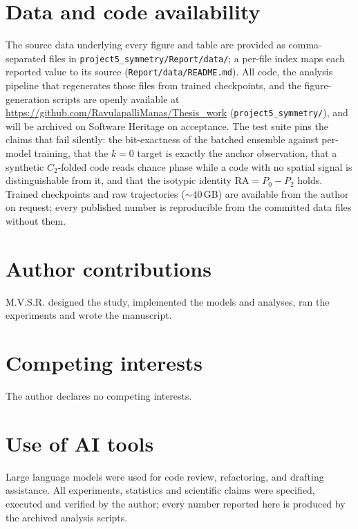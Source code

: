 \section*{Data and code availability}

The source data underlying every figure and table are provided as comma-separated files in
\texttt{project5\_symmetry/Report/data/}; a per-file index maps each reported value to its
source (\texttt{Report/data/README.md}). All code, the analysis pipeline that regenerates those
files from trained checkpoints, and the figure-generation scripts are openly available at
\url{https://github.com/RavulapalliManas/Thesis_work} (\texttt{project5\_symmetry/}), and will
be archived on Software Heritage on acceptance. The test suite pins the claims that fail
silently: the bit-exactness of the batched ensemble against per-model training, that the $k=0$
target is exactly the anchor observation, that a synthetic $C_2$-folded code reads chance phase
while a code with no spatial signal is distinguishable from it, and that the isotypic identity
$\mathrm{RA} = P_0 - P_2$ holds. Trained checkpoints and raw trajectories ($\sim$40\,GB) are
available from the author on request; every published number is reproducible from the committed
data files without them.

\section*{Author contributions}
M.V.S.R. designed the study, implemented the models and analyses, ran the experiments and wrote
the manuscript.

\section*{Competing interests}
The author declares no competing interests.

\section*{Use of AI tools}
Large language models were used for code review, refactoring, and drafting assistance. All
experiments, statistics and scientific claims were specified, executed and verified by the
author; every number reported here is produced by the archived analysis scripts.




